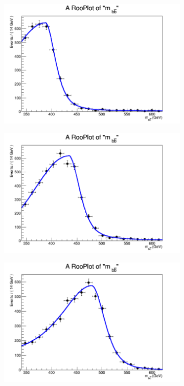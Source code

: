 \begin{figure}[phtb!]
  \begin{center}
  \begin{subfigure}[$m_{A}=400$ GeV]{0.4\textwidth}\includegraphics[width=\textwidth]{FitResults/images/fitMC_bAbb400_1.png}\end{subfigure}
  \begin{subfigure}[$m_{A}=450$ GeV]{0.4\textwidth}\includegraphics[width=\textwidth]{FitResults/images/fitMC_bAbb450_1.png}\end{subfigure}
  \begin{subfigure}[$m_{A}=500$ GeV]{0.4\textwidth}\includegraphics[width=\textwidth]{FitResults/images/fitMC_bAbb500_1.png}\end{subfigure}

\end{center}
\end{figure}
